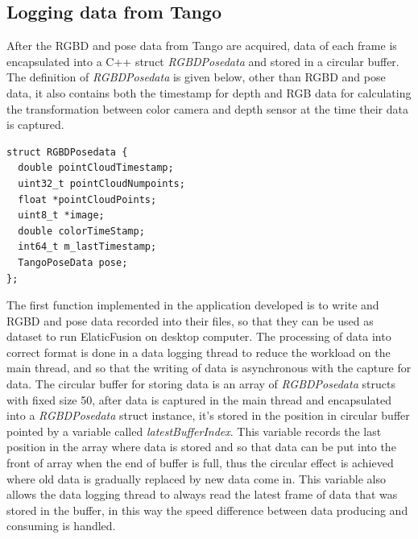 \documentclass[12pt,twoside]{article}
\begin{document}
\subsection{Logging data from Tango}
After the RGBD and pose data from Tango are acquired, data of each frame is encapsulated into a C++ struct \textit{RGBDPosedata} and stored in a circular buffer. The definition of \textit{RGBDPosedata} is given below, other than RGBD and pose data, it also contains both the timestamp for depth and RGB data for calculating the transformation between color camera and depth sensor at the time their data is captured.\\
\begin{lstlisting}
struct RGBDPosedata {
  double pointCloudTimestamp;
  uint32_t pointCloudNumpoints;
  float *pointCloudPoints;
  uint8_t *image;
  double colorTimeStamp;
  int64_t m_lastTimestamp;
  TangoPoseData pose;
};
\end{lstlisting}
The first function implemented in the application developed is to write and RGBD and pose data recorded into their files, so that they can be used as dataset to run ElaticFusion on desktop computer. The processing of data into correct format is done in a data logging thread to reduce the workload on the main thread, and so that the writing of data is asynchronous with the capture for data. The circular buffer for storing data is an array of \textit{RGBDPosedata} structs with fixed size 50, after data is captured in the main thread and encapsulated into a \textit{RGBDPosedata} struct instance, it's stored in the position in circular buffer pointed by a variable called
\textit{latestBufferIndex}. This variable records the last position in the array where data is stored and so that data can be put into the front of array when the end of buffer is full, thus the circular effect is achieved where old data is gradually replaced by new data come in. This variable also allows the data logging thread to always read the latest frame of data that was stored in the buffer, in this way the speed difference between data producing and consuming is handled.\\
\\
\end{document}
